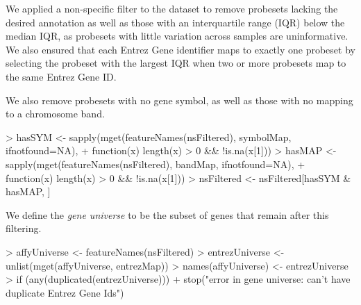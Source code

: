 \documentclass[11pt]{article}
\begin{document}
We applied a non-specific filter to the dataset to remove probesets
lacking the desired annotation as well as those with an interquartile
range (IQR) below the median IQR, as probesets with little variation
across samples are uninformative.  We also ensured that each Entrez
Gene identifier maps to exactly one probeset by selecting the probeset
with the largest IQR when two or more probesets map to the same Entrez
Gene ID.
%
\begin{Schunk}
\end{Schunk}
%
We also remove probesets with no gene symbol, as well as those with no
mapping to a chromosome band.
%
\begin{Schunk}
\begin{Sinput}
> hasSYM <- sapply(mget(featureNames(nsFiltered), symbolMap, ifnotfound=NA),
+                  function(x) length(x) > 0 && !is.na(x[1]))
> hasMAP <- sapply(mget(featureNames(nsFiltered), bandMap, ifnotfound=NA),
+                  function(x) length(x) > 0 && !is.na(x[1]))
> nsFiltered <- nsFiltered[hasSYM & hasMAP, ]
\end{Sinput}
\end{Schunk}
%
We define the \textit{gene universe} to be the subset of genes that
remain after this filtering.
%
\begin{Schunk}
\begin{Sinput}
> affyUniverse <- featureNames(nsFiltered)
> entrezUniverse <- unlist(mget(affyUniverse, entrezMap))
> names(affyUniverse) <- entrezUniverse
> if (any(duplicated(entrezUniverse)))
+     stop("error in gene universe: can't have duplicate Entrez Gene Ids")
\end{Sinput}
\end{Schunk}
\end{document}
